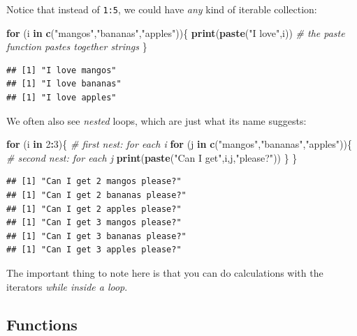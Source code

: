 \documentclass[]{book}
\newenvironment{Shaded}{\begin{snugshade}}{\end{snugshade}}
\newcommand{\KeywordTok}[1]{\textcolor[rgb]{0.13,0.29,0.53}{\textbf{#1}}}
\newcommand{\DecValTok}[1]{\textcolor[rgb]{0.00,0.00,0.81}{#1}}
\newcommand{\StringTok}[1]{\textcolor[rgb]{0.31,0.60,0.02}{#1}}
\newcommand{\CommentTok}[1]{\textcolor[rgb]{0.56,0.35,0.01}{\textit{#1}}}
\newcommand{\ControlFlowTok}[1]{\textcolor[rgb]{0.13,0.29,0.53}{\textbf{#1}}}
\newcommand{\OperatorTok}[1]{\textcolor[rgb]{0.81,0.36,0.00}{\textbf{#1}}}
\newcommand{\NormalTok}[1]{#1}
\begin{document}
Notice that instead of \texttt{1:5}, we could have \emph{any} kind of
iterable collection:

\begin{Shaded}
\begin{Highlighting}[]
\ControlFlowTok{for}\NormalTok{ (i }\ControlFlowTok{in} \KeywordTok{c}\NormalTok{(}\StringTok{"mangos"}\NormalTok{,}\StringTok{"bananas"}\NormalTok{,}\StringTok{"apples"}\NormalTok{))\{}
  \KeywordTok{print}\NormalTok{(}\KeywordTok{paste}\NormalTok{(}\StringTok{"I love"}\NormalTok{,i))  }\CommentTok{# the paste function pastes together strings}
\NormalTok{\}}
\end{Highlighting}
\end{Shaded}

\begin{verbatim}
## [1] "I love mangos"
## [1] "I love bananas"
## [1] "I love apples"
\end{verbatim}

We often also see \emph{nested} loops, which are just what its name
suggests:

\begin{Shaded}
\begin{Highlighting}[]
\ControlFlowTok{for}\NormalTok{ (i }\ControlFlowTok{in} \DecValTok{2}\OperatorTok{:}\DecValTok{3}\NormalTok{)\{}
  \CommentTok{# first nest: for each i}
  \ControlFlowTok{for}\NormalTok{ (j }\ControlFlowTok{in} \KeywordTok{c}\NormalTok{(}\StringTok{"mangos"}\NormalTok{,}\StringTok{"bananas"}\NormalTok{,}\StringTok{"apples"}\NormalTok{))\{}
    \CommentTok{# second nest: for each j}
    \KeywordTok{print}\NormalTok{(}\KeywordTok{paste}\NormalTok{(}\StringTok{"Can I get"}\NormalTok{,i,j,}\StringTok{"please?"}\NormalTok{))}
\NormalTok{  \}}
\NormalTok{\}}
\end{Highlighting}
\end{Shaded}

\begin{verbatim}
## [1] "Can I get 2 mangos please?"
## [1] "Can I get 2 bananas please?"
## [1] "Can I get 2 apples please?"
## [1] "Can I get 3 mangos please?"
## [1] "Can I get 3 bananas please?"
## [1] "Can I get 3 apples please?"
\end{verbatim}

The important thing to note here is that you can do calculations with
the iterators \emph{while inside a loop}.

\subsection{Functions}\label{functions}
\end{document}
